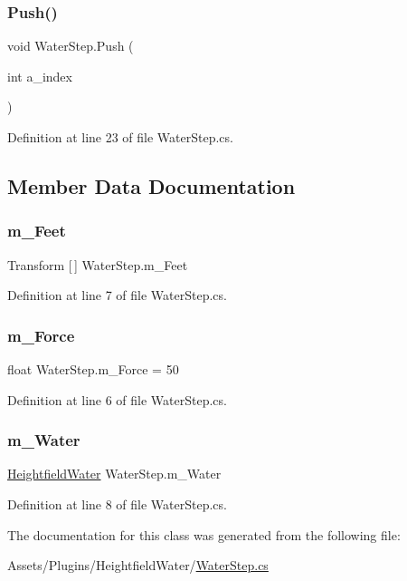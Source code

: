 \subsubsection{\texorpdfstring{Push()}{Push()}}
{\footnotesize\ttfamily void Water\+Step.\+Push (\begin{DoxyParamCaption}\item[{int}]{a\+\_\+index }\end{DoxyParamCaption})}



Definition at line 23 of file Water\+Step.\+cs.



\subsection{Member Data Documentation}
\mbox{\label{class_water_step_a932bd8f50774e29fc2bcdcb9d1fbf0fe}} 
\subsubsection{\texorpdfstring{m\+\_\+\+Feet}{m\_Feet}}
{\footnotesize\ttfamily Transform \mbox{[}$\,$\mbox{]} Water\+Step.\+m\+\_\+\+Feet}



Definition at line 7 of file Water\+Step.\+cs.

\mbox{\label{class_water_step_a217c01cdaeb90ab2d85a0afefc8cc249}} 
\subsubsection{\texorpdfstring{m\+\_\+\+Force}{m\_Force}}
{\footnotesize\ttfamily float Water\+Step.\+m\+\_\+\+Force = 50}



Definition at line 6 of file Water\+Step.\+cs.

\mbox{\label{class_water_step_a31364632b410b9192c1e7db08d001a4f}} 
\subsubsection{\texorpdfstring{m\+\_\+\+Water}{m\_Water}}
{\footnotesize\ttfamily \mbox{\hyperlink{class_heightfield_water}{Heightfield\+Water}} Water\+Step.\+m\+\_\+\+Water}



Definition at line 8 of file Water\+Step.\+cs.



The documentation for this class was generated from the following file\+:\begin{DoxyCompactItemize}
\item 
Assets/\+Plugins/\+Heightfield\+Water/\mbox{\hyperlink{_water_step_8cs}{Water\+Step.\+cs}}\end{DoxyCompactItemize}
